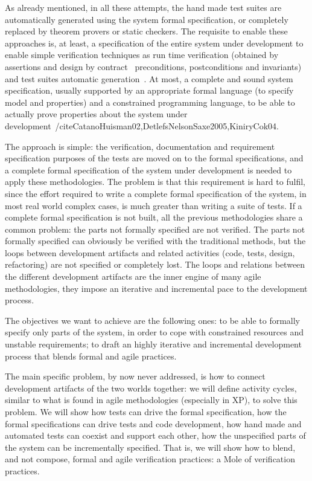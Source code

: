 \documentclass[english]{lni}
\begin{document}
As already mentioned, in all these attempts, the hand made test suites are automatically generated using the system formal specification, or completely replaced by theorem provers or static checkers. 
The requisite to enable these approaches is, at least, a specification of the entire system under development to enable simple verification techniques as run time verification (obtained by assertions and design by contract~\cite{Meyer1997} preconditions, postconditions and invariants) and test suites automatic generation~\cite{Cheon2002,Cheon2004,Cheon2005}.
At most, a complete and sound system specification, usually supported by an appropriate formal language (to specify model and properties) and a constrained programming language, to be able to actually prove properties about the system under development~/cite{CatanoHuisman02,DetlefsNelsonSaxe2005,KiniryCok04}.

The approach is simple: the verification, documentation and requirement specification purposes of the tests are moved on to the formal specifications, and a complete formal specification of the system under development is needed to apply these methodologies.
The problem is that this requirement is hard to fulfil, since the effort required to write a complete formal specification of the system, in most real world complex cases, is much greater than writing a suite of tests.
If a complete formal specification is not built, all the previous methodologies share a common problem: the parts not formally specified are not verified.
The parts not formally specified can obviously be verified with the traditional methods, but the loops between development artifacts and related activities (code, tests, design, refactoring) are not specified or completely lost.
The loops and relations between the different development artifacts are the inner engine of many agile methodologies, they impose an iterative and incremental pace to the development process.

The objectives we want to achieve are the following ones: to be able to formally specify only parts of the system, in order to cope with constrained resources and unstable requirements; to draft an highly iterative and incremental development process that blends formal and agile practices.

The main specific problem, by now never addressed, is how to connect development artifacts of the two worlds together: we will define activity cycles, similar to what is found in agile methodologies (especially in XP), to solve this problem.
We will show how tests can drive the formal specification, how the formal specifications can drive tests and code development, how hand made and automated tests can coexist and support each other, how the unspecified parts of the system can be incrementally specified.
That is, we will show how to blend, and not compose, formal and agile verification practices: a Mole of verification practices.
\end{document}
